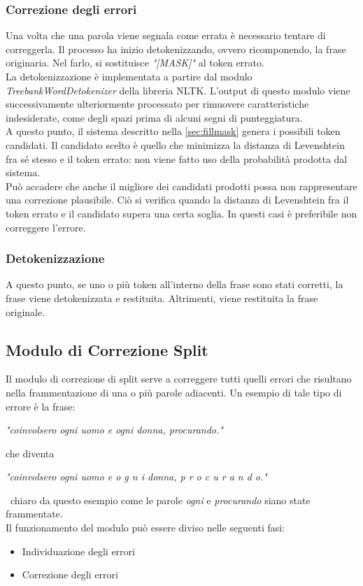 \documentclass[12pt]{article}
\begin{document}
\subsubsection{Correzione degli errori}
Una volta che una parola viene segnala come errata è necessario tentare di correggerla. Il processo ha inizio detokenizzando, ovvero ricomponendo, la frase originaria. Nel farlo, si sostituisce \textit{"[MASK]"} al token errato.\\
La detokenizzazione è implementata a partire dal modulo \textit{TreebankWordDetokenizer} della libreria NLTK. L'output di questo modulo viene successivamente ulteriormente processato per rimuovere caratteristiche indesiderate, come degli spazi prima di alcuni segni di punteggiatura.\\
A questo punto, il sistema descritto nella \autoref{sec:fillmask} genera i possibili token candidati. Il candidato scelto è quello che minimizza la distanza di Levenshtein fra sé stesso e il token errato: non viene fatto uso della probabilità prodotta dal sistema.\\
Può accadere che anche il migliore dei candidati prodotti possa non rappresentare una correzione plausibile. Ciò si verifica quando la distanza di Levenshtein fra il token errato e il candidato supera una certa soglia. In questi casi è preferibile non correggere l'errore.

\subsubsection{Detokenizzazione}
A questo punto, se uno o più token all'interno della frase sono stati corretti, la frase viene detokenizzata e restituita. Altrimenti, viene restituita la frase originale.

\subsection{Modulo di Correzione Split}
Il modulo di correzione di split serve a correggere tutti quelli errori che risultano nella frammentazione di una o più parole adiacenti. Un esempio di tale tipo di errore è la frase:
\begin{center}
\textit{"coinvolsero ogni uomo e ogni donna, procurando."}
\end{center}
che diventa
\begin{center}
\textit{"coinvolsero ogni uomo e o g n i donna, p r o c u r a n d o."}
\end{center}
\E\ chiaro da questo esempio come le parole \textit{ogni} e \textit{procurando} siano state frammentate.\\
Il funzionamento del modulo può essere diviso nelle seguenti fasi:
\begin{itemize}
\item Individuazione degli errori
\item Correzione degli errori
\end{itemize}
\end{document}
